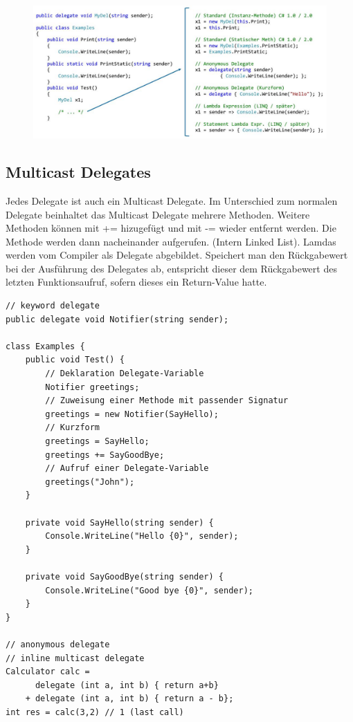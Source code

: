 \documentclass[
a4paper,
oneside,
10pt,
fleqn,
headsepline,
toc=listofnumbered, 
bibliography=totocnumbered]{scrartcl}
\begin{document}
\begin{figure}[h]
	\centering
	\includegraphics[width=0.9\linewidth]{images/delegate_lamda_overview}
\end{figure}

\subsection{Multicast Delegates}
Jedes Delegate ist auch ein Multicast Delegate. Im Unterschied zum normalen Delegate beinhaltet das Multicast Delegate mehrere Methoden. Weitere Methoden können mit += hizugefügt und mit -= wieder entfernt werden. Die Methode werden dann nacheinander aufgerufen. (Intern Linked List). Lamdas werden vom Compiler als Delegate abgebildet.  Speichert man den Rückgabewert bei der Ausführung des Delegates ab, entspricht dieser dem Rückgabewert des letzten Funktionsaufruf, sofern dieses ein Return-Value hatte. 
\begin{lstlisting}
// keyword delegate
public delegate void Notifier(string sender);

class Examples {
	public void Test() {
		// Deklaration Delegate-Variable
		Notifier greetings; 
		// Zuweisung einer Methode mit passender Signatur
		greetings = new Notifier(SayHello); 
		// Kurzform
		greetings = SayHello;
		greetings += SayGoodBye;
		// Aufruf einer Delegate-Variable
		greetings("John");
	}

	private void SayHello(string sender) {
		Console.WriteLine("Hello {0}", sender);
	}
	
	private void SayGoodBye(string sender) {
		Console.WriteLine("Good bye {0}", sender);
	}
} 

// anonymous delegate
// inline multicast delegate
Calculator calc =  
	  delegate (int a, int b) { return a+b}
	+ delegate (int a, int b) { return a - b};
int res = calc(3,2) // 1 (last call)
\end{lstlisting}
\end{document}
